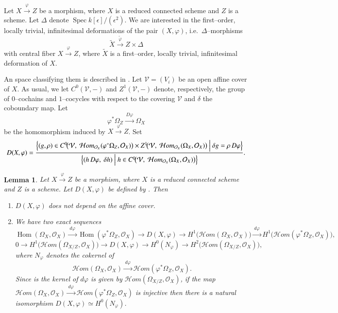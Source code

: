\documentclass[11pt,twoside]{amsart}
\theoremstyle{plain}
\numberwithin{equation}{section}
\newtheorem{lemma}[theorem]{Lemma}
\theoremstyle{definition}
\begin{document}
Let $X \xrightarrow{\varphi} Z$ be a morphism, where $X$ is a reduced connected scheme and $Z$
is a scheme. Let $\Delta$ denote $\operatorname{Spec} k[\epsilon]/(\epsilon^{2})$. We are interested in the
first--order, locally trivial, infinitesimal deformations of the pair $(X,\varphi)$, i.e.\ $\Delta$--morphisms
\[
\widetilde{X} \xrightarrow{\widetilde{\varphi}} Z \times \Delta
\]
with central fiber $X \xrightarrow{\varphi} Z$, where $\widetilde{X}$ is a first--order, locally trivial,
infinitesimal deformation of $X$.

An space classifying them is described in \cite{Hor74}. Let $\mathcal V=(V_i)$ be an open affine cover of $X$.
As usual, we let $C^{0}(\mathcal V,-)$ and $Z^{1}(\mathcal V,-)$ denote, respectively, the group of
$0$--cochains and $1$--cocycles with respect to the covering $\mathcal V$ and $\delta$ the coboundary map.
Let
\[
\varphi^{*}\Omega_{Z} \xrightarrow{\,D\varphi\,} \Omega_{X}
\]
be the homomorphism induced by $X \xrightarrow{\varphi} Z$. Set
\begin{equation}\label{2.2.1}
D(X,\varphi)
=
\frac{
\Bigl\{(g,\rho)\in
C^{0}\!\bigl(\mathcal V,\ \mathcal{H}om_{\mathcal O_X}(\varphi^{*}\Omega_{Z},\mathcal O_X)\bigr)
\times
Z^{1}\!\bigl(\mathcal V,\ \mathcal{H}om_{\mathcal O_X}(\Omega_{X},\mathcal O_X)\bigr)
\ \Big|\ 
\delta g = \rho\, D\varphi
\Bigr\}
}{
\Bigl\{(h\,D\varphi,\ \delta h)\ \Big|\ 
h\in C^{0}\!\bigl(\mathcal V,\ \mathcal{H}om_{\mathcal O_X}(\Omega_{X},\mathcal O_X)\bigr)
\Bigr\}
}.
\end{equation}

\begin{lemma}\cite[4.2]{Hor74}\label{D(X varphi)}
Let $X \xrightarrow{\varphi} Z$ be a morphism, where $X$ is a reduced connected scheme and $Z$ is a scheme.
Let $D(X,\varphi)$ be defined by \Cref{2.2.1}. Then
\begin{enumerate}
\item $D(X,\varphi)$ does not depend on the affine cover.
\item We have two exact sequences
\[
\operatorname{Hom}(\Omega_{X},\mathcal O_{X})
\xrightarrow{\,d\varphi\,}
\operatorname{Hom}(\varphi^{*}\Omega_{Z},\mathcal O_{X})
\longrightarrow
D(X,\varphi)
\longrightarrow
H^{1}\!\bigl(\mathcal{H}om(\Omega_{X},\mathcal O_{X})\bigr)
\xrightarrow{\,d\varphi\,}
H^{1}\!\bigl(\mathcal{H}om(\varphi^{*}\Omega_{Z},\mathcal O_{X})\bigr),
\]
\[
0 \longrightarrow
H^{1}\!\bigl(\mathcal{H}om(\Omega_{X/Z},\mathcal O_{X})\bigr)
\longrightarrow
D(X,\varphi)
\longrightarrow
H^{0}(N_{\varphi})
\longrightarrow
H^{2}\!\bigl(\mathcal{H}om(\Omega_{X/Z},\mathcal O_{X})\bigr),
\]
where $N_{\varphi}$ denotes the cokernel of
\[
\mathcal{H}om(\Omega_{X},\mathcal O_{X})
\xrightarrow{\,d\varphi\,}
\mathcal{H}om(\varphi^{*}\Omega_{Z},\mathcal O_{X}).
\]
Since is the kernel of $d\varphi$ is given by $\mathcal{H}om(\Omega_{X/Z},\mathcal O_{X})$, if the map
$\mathcal{H}om(\Omega_{X},\mathcal O_{X})
\xrightarrow{\,d\varphi\,}
\mathcal{H}om(\varphi^{*}\Omega_{Z},\mathcal O_{X})$
is injective then there is a natural isomorphism $D(X,\varphi)\simeq H^{0}(N_{\varphi})$. 
\end{enumerate}
\end{lemma}
\end{document}
